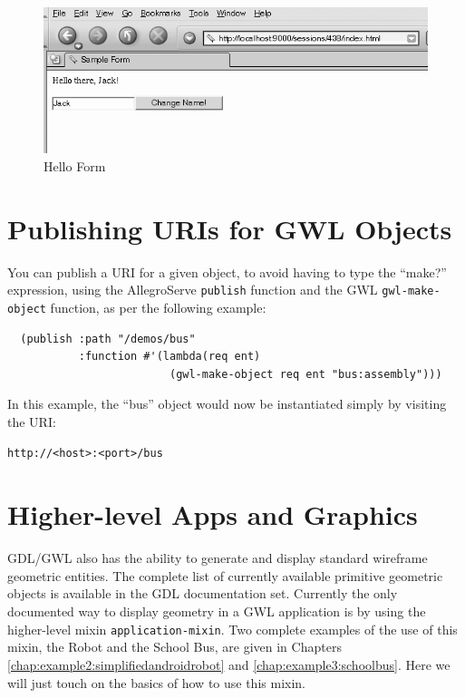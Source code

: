 \documentclass [11pt]{book}
\begin{document}
\begin{figure}
\begin{center}
\includegraphics{../images/hello-form.png}
\end{center}

\caption{Hello Form}

\label{fig:hello-form}

\end{figure}


\section{Publishing URIs for GWL Objects}

\label{sec:publishingurisforgwlobjects}

You can publish a URI for a given object, to avoid having to type the
``make?'' expression, using the AllegroServe \texttt{publish} function and the GWL \texttt{gwl-make-object} function, as per the following example:

\begin{verbatim}
  (publish :path "/demos/bus"
           :function #'(lambda(req ent)
                         (gwl-make-object req ent "bus:assembly")))
\end{verbatim}In this example, the ``bus'' object would now be instantiated simply by
visiting the URI:

\begin{verbatim}http://<host>:<port>/bus
\end{verbatim}

\section{Higher-level Apps and Graphics}

\label{sec:higher-levelappsandgraphics}

GDL/GWL also has the ability to generate and display standard wireframe geometric
entities. The complete list of currently available primitive geometric objects is available
in the GDL documentation set. Currently the only documented way to display geometry in
a GWL application is by using the higher-level mixin \texttt{application-mixin}. Two complete examples of the use of this mixin, the Robot and the School Bus, are
given in Chapters 
\ref{chap:example2:simplifiedandroidrobot} and 
\ref{chap:example3:schoolbus}. Here we will just touch on the basics of how to use this
mixin.
\end{document}
